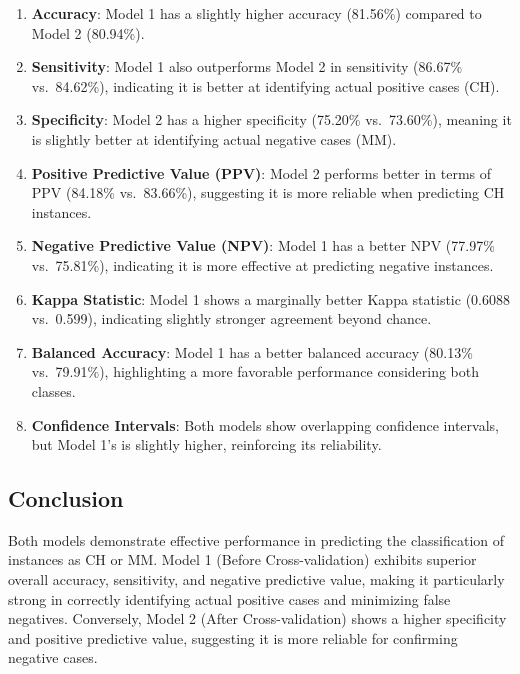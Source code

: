 \documentclass[
]{article}
\providecommand{\tightlist}{%
  \setlength{\itemsep}{0pt}\setlength{\parskip}{0pt}}
\begin{document}
\begin{enumerate}
\def\labelenumi{\arabic{enumi}.}
\tightlist
\item
  \textbf{Accuracy}: Model 1 has a slightly higher accuracy (81.56\%)
  compared to Model 2 (80.94\%).
\item
  \textbf{Sensitivity}: Model 1 also outperforms Model 2 in sensitivity
  (86.67\% vs.~84.62\%), indicating it is better at identifying actual
  positive cases (CH).
\item
  \textbf{Specificity}: Model 2 has a higher specificity (75.20\%
  vs.~73.60\%), meaning it is slightly better at identifying actual
  negative cases (MM).
\item
  \textbf{Positive Predictive Value (PPV)}: Model 2 performs better in
  terms of PPV (84.18\% vs.~83.66\%), suggesting it is more reliable
  when predicting CH instances.
\item
  \textbf{Negative Predictive Value (NPV)}: Model 1 has a better NPV
  (77.97\% vs.~75.81\%), indicating it is more effective at predicting
  negative instances.
\item
  \textbf{Kappa Statistic}: Model 1 shows a marginally better Kappa
  statistic (0.6088 vs.~0.599), indicating slightly stronger agreement
  beyond chance.
\item
  \textbf{Balanced Accuracy}: Model 1 has a better balanced accuracy
  (80.13\% vs.~79.91\%), highlighting a more favorable performance
  considering both classes.
\item
  \textbf{Confidence Intervals}: Both models show overlapping confidence
  intervals, but Model 1's is slightly higher, reinforcing its
  reliability.
\end{enumerate}

\hypertarget{conclusion}{%
\subsection{Conclusion}\label{conclusion}}

Both models demonstrate effective performance in predicting the
classification of instances as CH or MM. Model 1 (Before
Cross-validation) exhibits superior overall accuracy, sensitivity, and
negative predictive value, making it particularly strong in correctly
identifying actual positive cases and minimizing false negatives.
Conversely, Model 2 (After Cross-validation) shows a higher specificity
and positive predictive value, suggesting it is more reliable for
confirming negative cases.
\end{document}
